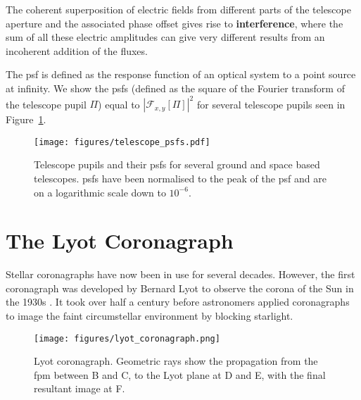 \documentclass[letterpaper]{ar-1col}
\begin{document}


The coherent superposition of electric fields from different parts of the telescope aperture and the associated phase offset gives rise to \textbf{interference}, where the sum of all these electric amplitudes can give very different results from an incoherent addition of the fluxes.

The \ac{psf} is defined as the response function of an optical system to a point source at infinity.
%
We show the \acp{psf} (defined as the square of the Fourier transform of the telescope pupil $\Pi$) equal to $|\mathcal{F}_{x,y}[\Pi]|^2$ for several telescope pupils seen in Figure~\ref{fig:telpsfs}.

\begin{figure}[ht]
  \centering
  \texttt{[image: figures/telescope\_psfs.pdf]}
  \caption{Telescope pupils and their \acp{psf} for several ground and space based telescopes.
  \acp{psf} have been normalised to the peak of the \ac{psf} and are on a logarithmic scale down to $10^{-6}$.}
  \label{fig:telpsfs}
\end{figure}


\section{The Lyot Coronagraph}

Stellar coronagraphs have now been in use for several decades.
%
However, the first coronagraph was developed by Bernard Lyot to observe the corona of the Sun in the 1930s \citep{Lyot39}.
%
It took over half a century before astronomers applied coronagraphs to image the faint circumstellar environment by blocking starlight. 

\begin{figure}[ht]
  \centering
  \texttt{[image: figures/lyot\_coronagraph.png]}
  \caption{Lyot coronagraph.
  Geometric rays show the propagation from the \ac{fpm} between B and C, to the Lyot plane at D and E, with the final resultant image at F.}
  \label{fig:lyot}
\end{figure}
\end{document}
